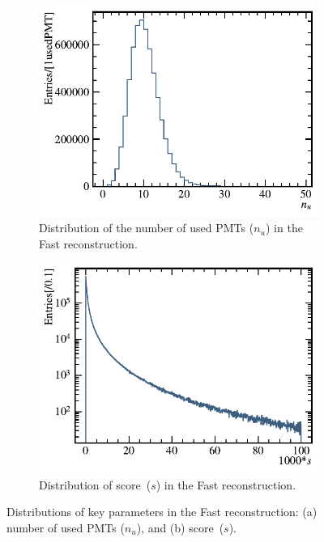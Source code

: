 \begin{figure}[!htbp]
	\centering

	\begin{subfigure}[b]{0.4\textwidth}
		\includegraphics[width=\textwidth]{neutrontag/fastrecon/usedPMT.pdf}
		\caption{Distribution of the number of used PMTs ($n_u$) in the Fast reconstruction.}
		\label{fast:combined:a}
	\end{subfigure}

	\begin{subfigure}[b]{0.4\textwidth}
		\includegraphics[width=\textwidth]{neutrontag/fastrecon/score.pdf}
		\caption{Distribution of score~($s$) in the Fast reconstruction.}
		\label{fast:combined:b}
	\end{subfigure}

	\caption{Distributions of key parameters in the Fast reconstruction: (a) number of used PMTs ($n_u$), and (b) score~($s$).}
	\label{fast:combined}
\end{figure}


